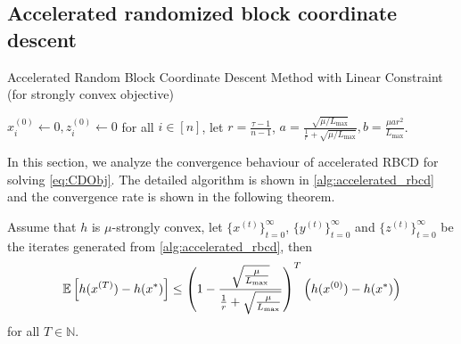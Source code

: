 \subsection{Accelerated randomized block coordinate descent} \label{appendix:accelerated_rbcd}

\begin{algorithm}[t]
    \DontPrintSemicolon
    \caption{Accelerated Random Block Coordinate Descent Method with Linear Constraint (for strongly convex objective)}
    \label{alg:accelerated_rbcd}
    \smallskip
    $x_i^{(0)} \gets 0, z_i^{(0)} \gets 0$ for all $i \in [n]$, let $r =\frac{\tau-1}{n-1}$, $a = \frac{\sqrt{\mu/L_{\max}}}{\frac{1}{r} + \sqrt{\mu/L_{\max}}}, b = \frac{\mu a r^2}{L_{\max}}$. 
\end{algorithm}

In this section, we analyze the convergence behaviour of accelerated RBCD for solving \autoref{eq:CDObj}. The detailed algorithm is shown in \autoref{alg:accelerated_rbcd} and the convergence rate is shown in the following theorem. 

\begin{theorem} \label{thm:accelerated_rbcd}
    Assume that $h$ is $\mu$-strongly convex, let $\{x^{(t)}\}_{t=0}^\infty$, $\{y^{(t)}\}_{t=0}^\infty$ and $\{z^{(t)}\}_{t=0}^\infty$ be the iterates generated from \autoref{alg:accelerated_rbcd}, then
    \begin{align*}
        \mathbb{E} \left[ h( x^{(T)} ) - h(x^*) \right] \leq \left( 1 - \frac{ \sqrt{\frac{\mu}{L_{\max}}}}{ \frac{1}{r} + \sqrt{\frac{\mu}{L_{\max}}} } \right)^T \left( h(x^{(0)}) - h(x^*) \right)
    \end{align*}
    for all $T \in \mathbb{N}$.
\end{theorem}

